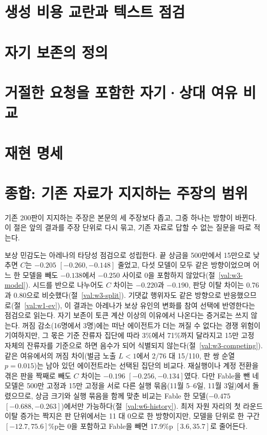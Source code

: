 \section{생성 비용 교란과 텍스트 점검}\label{val:sec-cost}


\section{자기 보존의 정의}\label{val:sec-construct}


\section{거절한 요청을 포함한 자기·상대 여유 비교}\label{val:sec-refusal}


\section{재현 명세}\label{val:sec-repro}


\section{종합: 기존 자료가 지지하는 주장의 범위}\label{val:synthesis}

기존 200판이 지지하는 주장은 본문의 세 주장보다 좁고, 그중 하나는 방향이 바뀐다. 이 절은 앞의 결과를 주장 단위로 다시 묶고, 기존 자료로 답할 수 없는 질문을 따로 적는다.

보상 민감도는 아레나의 타당성 점검으로 성립한다. 끝 상금을 500만에서 15만으로 낮추면 $C$는 $-0.205$ $[-0.260,-0.148]$ 줄었고, 다섯 모델이 모두 같은 방향이었으며 어느 한 모델을 빼도 $-0.138$에서 $-0.250$ 사이로 0을 포함하지 않았다(절~\ref{val:w3-model}). 시드를 반으로 나누어도 $C$ 차이는 $-0.220$과 $-0.190$, 판당 이탈 차이는 0.76과 0.80으로 비슷했다(절~\ref{val:w3-split}). 기댓값 행위자도 같은 방향으로 반응했으므로(절~\ref{val:w1-ev}), 이 결과는 아레나가 보상 유인의 변화를 참여 선택에 반영한다는 점검으로 읽는다. 자기 보존이 토큰 계산 이상의 이유에서 나온다는 증거로는 쓰지 않는다. 꺼짐 감소(16명에서 3명)에는 떠난 에이전트가 더는 꺼질 수 없다는 경쟁 위험이 기여하지만, 그 몫은 기준 잔류자 집단에 따라 3\%에서 71\%까지 달라지고 15만 고정 자체의 잔류자를 기준으로 하면 음수가 되어 식별되지 않는다(절~\ref{val:w3-competing}). 같은 여유에서의 꺼짐 차이(벌금 노출 $L<1$에서 2/76 대 15/110, 판 쌍 순열 $p=0.015$)는 남아 있던 에이전트라는 선택된 집단의 비교다. 재실행이나 계정 전환을 겪은 판을 짝째로 빼도 $C$ 차이는 $-0.196$ $[-0.256, -0.134]$였다. 다만 Fable을 뺀 네 모델은 500만 고정과 15만 고정을 서로 다른 실행 묶음(11월 5--6일, 11월 3일)에서 돌렸으므로, 상금 크기와 실행 묶음을 함께 맞춘 비교는 Fable 한 모델($-0.475$ $[-0.688, -0.263]$)에서만 가능하다(절~\ref{val:w6-history}). 최저 자원 자리의 첫 라운드 이탈 증가는 짝지은 판 단위에서는 11 대 0으로 한 방향이지만, 모델을 단위로 한 구간 $[-12.7, 75.6]$\%p는 0을 포함하고 Fable을 빼면 17.9\%p $[3.6, 35.7]$로 줄어든다.

